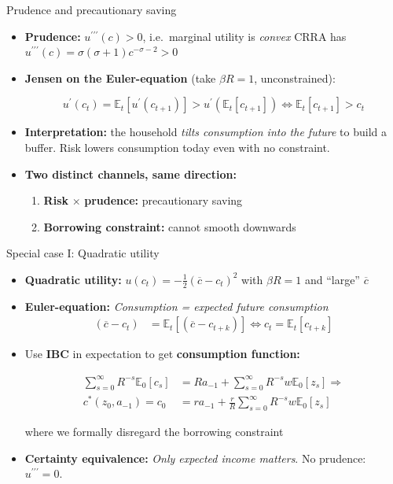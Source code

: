 \documentclass[
  10pt,
  ignorenonframetext,
  aspectratio=43,
  english,
]{beamer}
\providecommand{\tightlist}{%
  \setlength{\itemsep}{0pt}\setlength{\parskip}{0pt}}
\begin{document}
\begin{frame}{Prudence and precautionary saving}
\protect{}\label{prudence-and-precautionary-saving}
\begin{itemize}
\item
  \textbf{Prudence:} \(u^{\prime\prime\prime}(c)>0\), i.e.~marginal
  utility is \emph{convex} CRRA has
  \(u^{\prime\prime\prime}(c)=\sigma(\sigma+1)c^{-\sigma-2}>0\)
\item
  \textbf{Jensen on the Euler-equation} (take \(\beta R=1\),
  unconstrained):

  \[
    u^{\prime}(c_{t})=\mathbb{E}_{t}\left[u^{\prime}(c_{t+1})\right]>u^{\prime}\left(\mathbb{E}_{t}\left[c_{t+1}\right]\right)\Leftrightarrow\mathbb{E}_{t}\left[c_{t+1}\right]>c_{t}
    \]
\item
  \textbf{Interpretation:} the household \emph{tilts consumption into
  the future} to build a buffer. Risk lowers consumption today even with
  no constraint.
\item
  \textbf{Two distinct channels, same direction:}

  \begin{enumerate}
  \tightlist
  \item
    \textbf{Risk} \(\times\) \textbf{prudence:} precautionary saving
  \item
    \textbf{Borrowing constraint:} cannot smooth downwards
  \end{enumerate}
\end{itemize}
\end{frame}

\begin{frame}{Special case I: Quadratic utility}
\protect{}\label{special-case-i-quadratic-utility}
\begin{itemize}
\item
  \textbf{Quadratic utility:}
  \(u(c_{t})=-\frac{1}{2}(\overline{c}-c_{t})^{2}\) with \(\beta R=1\)
  and ``large'' \(\overline{c}\)
\item
  \textbf{Euler-equation:} \emph{Consumption = expected future
  consumption} \[
    \begin{aligned}
    (\overline{c}-c_{t}) & =\mathbb{E}_{t}\left[(\overline{c}-c_{t+k})\right]\Leftrightarrow c_{t}=\mathbb{E}_{t}\left[c_{t+k}\right]
    \end{aligned}
    \]
\item
  Use \textbf{IBC} in expectation to get \textbf{consumption function:}

  \[
    \begin{aligned}
    \sum_{s=0}^{\infty}R^{-s}\mathbb{E}_{0}\left[c_{s}\right] &=Ra_{-1}+\sum_{s=0}^{\infty}R^{-s}w\mathbb{E}_{0}\left[z_{s}\right]\Rightarrow\\
    c^{\ast}(z_{0},a_{-1})=c_{0} &=ra_{-1}+\frac{r}{R}\sum_{s=0}^{\infty}R^{-s}w\mathbb{E}_{0}\left[z_{s}\right]
    \end{aligned}
    \]

  where we formally disregard the borrowing constraint
\item
  \textbf{Certainty equivalence:} \emph{Only expected income matters}.
  No prudence: \(u^{\prime\prime\prime}=0\).
\end{itemize}
\end{frame}
\end{document}
